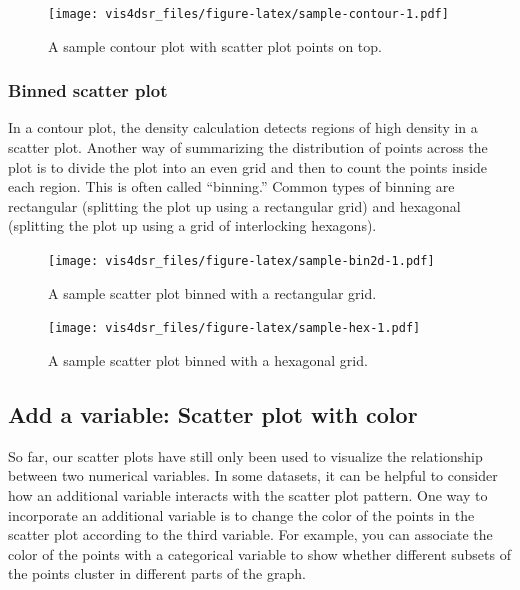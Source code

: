 \documentclass[
]{krantz}
\begin{document}
\begin{figure}
\centering
\texttt{[image: vis4dsr\_files/figure-latex/sample-contour-1.pdf]}
\caption{\label{fig:sample-contour}A sample contour plot with scatter plot points on top.}
\end{figure}

\hypertarget{binned-scatter-plot}{%
\subsubsection{Binned scatter plot}\label{binned-scatter-plot}}

In a contour plot, the density calculation detects regions of high density in a
scatter plot. Another way of summarizing the distribution of points across the plot
is to divide the plot into an even grid and then to count the points inside each
region. This is often called ``binning.'' Common types of binning are rectangular
(splitting the plot up using a rectangular grid) and hexagonal (splitting the
plot up using a grid of interlocking hexagons).

\begin{figure}
\centering
\texttt{[image: vis4dsr\_files/figure-latex/sample-bin2d-1.pdf]}
\caption{\label{fig:sample-bin2d}A sample scatter plot binned with a rectangular grid.}
\end{figure}

\begin{figure}
\centering
\texttt{[image: vis4dsr\_files/figure-latex/sample-hex-1.pdf]}
\caption{\label{fig:sample-hex}A sample scatter plot binned with a hexagonal grid.}
\end{figure}

\hypertarget{add-a-variable-scatter-plot-with-color}{%
\subsection{Add a variable: Scatter plot with color}\label{add-a-variable-scatter-plot-with-color}}

So far, our scatter plots have still only been used to visualize the relationship
between two numerical variables. In some datasets, it can be helpful to consider
how an additional variable interacts with the scatter plot pattern. One way to
incorporate an additional variable is to change the color of the points in the
scatter plot according to the third variable. For example, you can associate the
color of the points with a categorical variable to show whether different subsets
of the points cluster in different parts of the graph.
\end{document}
